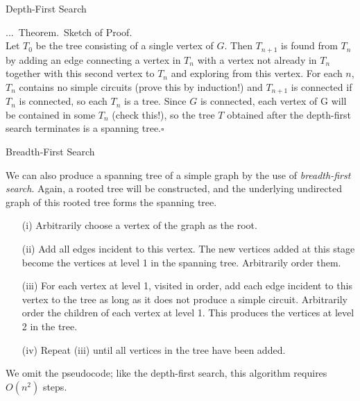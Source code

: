 \documentclass[smaller,hyperref={CJKbookmarks=true}]{beamer}
\newcounter{zhuo}[subsection]
\renewcommand{\thezhuo}{\thesection.\thesubsection.\arabic{zhuo}}
\newenvironment{THEOREM}{\stepcounter{zhuo}\alert{\thezhuo.~Theorem.\,}}{}
\begin{document}
\begin{frame}{Depth-First Search}
\begin{spacing}{1.1}
\begin{THEOREM}
\end{THEOREM}
\alert{Sketch of Proof.}\\
Let $T_0$ be the tree consisting of a single vertex of $G$. Then $T_{n+1}$ is found
from $T_n$ by adding an edge connecting a vertex in $T_n$ with a vertex not
already in $T_n$ together with this second vertex to $T_n$ and exploring from
this vertex. For each $n$, $T_n$ contains no simple circuits (prove this by
induction!) and $T_{n+1}$ is connected if $T_n$ is connected, so each $T_n$ is a tree.
Since $G$ is connected, each vertex of G will be contained in some $T_n$
(check this!), so the tree $T$ obtained after the depth-first search
terminates is a spanning tree.\hfill$\square$
\end{spacing}
\end{frame}
\begin{frame}[t]{Breadth-First Search}
\begin{spacing}{1.1}
We can also produce a spanning tree of a simple graph by the use of
\emph{breadth-first search}. Again, a rooted tree will be constructed, and the
underlying undirected graph of this rooted tree forms the spanning tree.
\begin{itemize}
  \item[(i)] Arbitrarily choose a vertex of the graph as the root.
  \item[(ii)] Add all edges incident to this vertex. The new vertices added at this stage become the vertices at level 1 in the spanning tree. Arbitrarily order them.
  \item[(iii)] For each vertex at level 1, visited in order, add each edge incident to this vertex to the tree as long as it does not produce a simple circuit. Arbitrarily order the children of each vertex at level 1. This produces the vertices at level 2 in the tree.
  \item[(iv)] Repeat (iii) until all vertices in the tree have been added.
\end{itemize}
We omit the pseudocode; like the depth-first search, this algorithm
requires $O(n^2)$ steps.
\end{spacing}
\end{frame}
\end{document}
